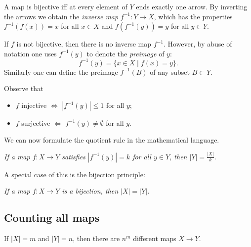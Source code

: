 \begin{page}
\setcounter{section}{2}
\setcounter{subsection}{2}
\setcounter{dfn}{1}
\label{portion:31}


A map is bijective iff at every element of $Y$ ends exactly one arrow.
By inverting the arrows we obtain the \emph{inverse map} $f^{-1} \colon Y \to X$,
which has the properties $f^{-1}(f(x)) = x$ for all $x \in X$ and $f(f^{-1}(y)) = y$ for all $y \in Y$.

If $f$ is not bijective, then there is no inverse map $f^{-1}$.
However, by abuse of notation one uses $f^{-1}(y)$ to denote the \emph{preimage} of $y$:
\[
f^{-1}(y) = \{x \in X \mid f(x) = y\}.
\]
Similarly one can define the preimage $f^{-1}(B)$ of any subset $B \subset Y$.

Observe that
\begin{itemize}
\item
$f$ injective $\Leftrightarrow$ $|f^{-1}(y)| \le 1$ for all $y$;
\item
$f$ surjective $\Leftrightarrow$ $f^{-1}(y) \ne \emptyset$ for all $y$.
\end{itemize}

We can now formulate the quotient rule in the mathematical language.

\begin{center}
\parbox{.75\textwidth}{\emph{If a map $f \colon X \to Y$ satisfies $|f^{-1}(y)| = k$ for all $y \in Y$, then $|Y| = \frac{|X|}{k}$.}}
\end{center}

A special case of this is the bijection principle:
\begin{center}
\parbox{.75\textwidth}{\emph{If a map $f \colon X \to Y$ is a bijection, then $|X| = |Y|$.}}
\end{center}



\end{page}

\begin{page}
\setcounter{section}{2}
\setcounter{subsection}{2}
\setcounter{dfn}{1}
\label{portion:33}

\subsection{Counting all maps}

\end{page}

\begin{page}
\setcounter{section}{2}
\setcounter{subsection}{2}
\setcounter{dfn}{2}
\label{portion:35}

\begin{thm}
\label{thm:AllMaps}
If $|X| = m$ and $|Y| = n$, then there are $n^m$ different maps $X \to Y$.
\end{thm}

\end{page}


